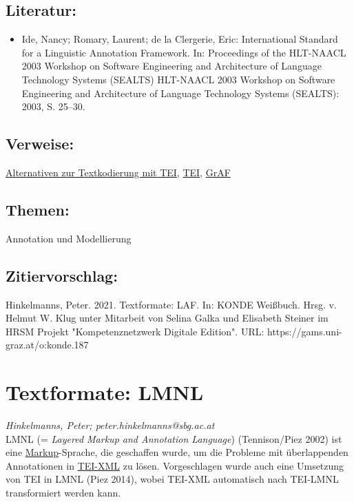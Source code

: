 \documentclass{article}
\begin{document}
        \subsection*{Literatur:}\begin{itemize}\item Ide, Nancy; Romary, Laurent; de la Clergerie, Eric: International Standard for a Linguistic Annotation Framework. In: Proceedings of the HLT-NAACL 2003 Workshop on Software Engineering and Architecture of Language Technology Systems (SEALTS) HLT-NAACL 2003 Workshop on Software Engineering and Architecture of Language Technology Systems (SEALTS): 2003, S. 25–30.\end{itemize}\subsection*{Verweise:}\href{https://gams.uni-graz.at/o:konde.15}{Alternativen zur Textkodierung mit TEI}, \href{https://gams.uni-graz.at/o:konde.178}{TEI}, \href{https://gams.uni-graz.at/o:konde.185}{GrAF}\subsection*{Themen:}Annotation und Modellierung\subsection*{Zitiervorschlag:}Hinkelmanns, Peter. 2021. Textformate: LAF. In: KONDE Weißbuch. Hrsg. v. Helmut W. Klug unter Mitarbeit von Selina Galka und Elisabeth Steiner im HRSM Projekt "Kompetenznetzwerk Digitale Edition". URL: https://gams.uni-graz.at/o:konde.187\newpage\section*{Textformate: LMNL} \emph{Hinkelmanns, Peter; peter.hinkelmanns@sbg.ac.at }\\
        
    LMNL (= \emph{Layered Markup and Annotation Language}) (Tennison/Piez 2002) ist eine \href{http://gams.uni-graz.at/o:konde.126}{Markup}-Sprache, die geschaffen wurde, um die Probleme mit überlappenden Annotationen in \href{http://gams.uni-graz.at/o:konde.178}{TEI-XML} zu lösen. Vorgeschlagen wurde auch eine Umsetzung von TEI in LMNL (Piez 2014), wobei TEI-XML automatisch nach TEI-LMNL transformiert werden kann. \\
            
\end{document}
